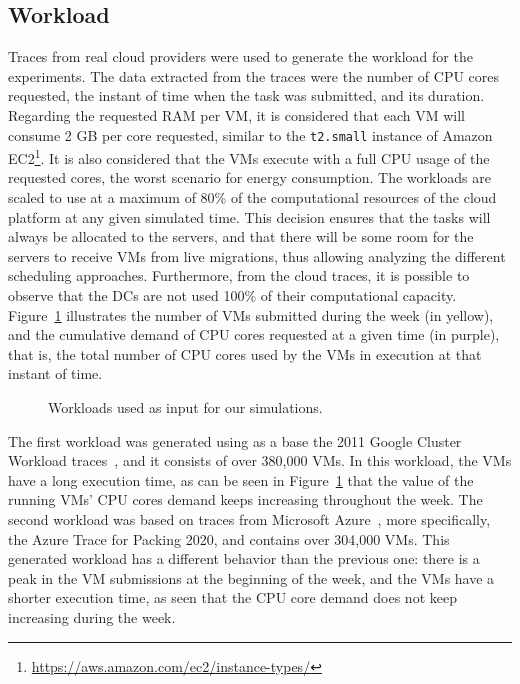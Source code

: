 \subsection{Workload}

Traces from real cloud providers were used to generate the workload for the experiments. The data extracted from the traces were the number of CPU cores requested, the instant of time when the task was submitted, and its duration. Regarding the requested RAM per VM, it is considered that each VM will consume 2 GB per core requested, similar to the \texttt{t2.small} instance of Amazon EC2\footnote{\url{https://aws.amazon.com/ec2/instance-types/}}. It is also considered that the VMs execute with a full CPU usage of the requested cores, the worst scenario for energy consumption. The workloads are scaled to use at a maximum of 80\% of the computational resources of the cloud platform at any given simulated time. This decision ensures that the tasks will always be allocated to the servers, and that there will be some room for the servers to receive VMs from live migrations, thus allowing analyzing the different scheduling approaches. Furthermore, from the cloud traces, it is possible to observe that the DCs are not used 100\% of their computational capacity. Figure~\ref{fig:workload} illustrates the number of VMs submitted during the week (in yellow), and the cumulative demand of CPU cores requested at a given time (in purple), that is, the total number of CPU cores used by the VMs in execution at that instant of time. 

\begin{figure}[!htbp]
  \centering
   {}
  \caption{Workloads used as input for our simulations.}
  \label{fig:workload}
 \end{figure}

The first workload was generated using as a base the 2011 Google Cluster Workload traces~\cite{google2011traces}, and it consists of over 380,000 VMs. In this workload, the VMs have a long execution time, as can be seen in Figure~\ref{fig:workload} that the value of the running VMs' CPU cores demand keeps increasing throughout the week. The second workload was based on traces from Microsoft Azure~\cite{hadary2020protean}, more specifically, the Azure Trace for Packing 2020, and contains over 304,000 VMs. This generated workload has a different behavior than the previous one: there is a peak in the VM submissions at the beginning of the week, and the VMs have a shorter execution time, as seen that the CPU core demand does not keep increasing during the week.

